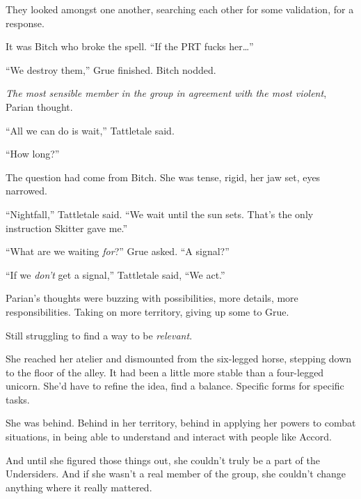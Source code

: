 They looked amongst one another, searching each other for some validation, for a response.



It was Bitch who broke the spell.  ``If the PRT fucks her\ldots''



``We destroy them,'' Grue finished.  Bitch nodded.



\emph{The most sensible member in the group in agreement with the most violent}, Parian thought.



``All we can do is wait,'' Tattletale said.



``How long?''



The question had come from Bitch.  She was tense, rigid, her jaw set, eyes narrowed.



``Nightfall,'' Tattletale said.  ``We wait until the sun sets.  That's the only instruction Skitter gave me.''



``What are we waiting \emph{for}?'' Grue asked.  ``A signal?''



``If we \emph{don't} get a signal,'' Tattletale said, ``We act.''



\blacksquare



Parian's thoughts were buzzing with possibilities, more details, more responsibilities.  Taking on more territory, giving up some to Grue.



Still struggling to find a way to be \emph{relevant}.



She reached her atelier and dismounted from the six-legged horse, stepping down to the floor of the alley.  It had been a little more stable than a four-legged unicorn.  She'd have to refine the idea, find a balance.  Specific forms for specific tasks.



She was behind.  Behind in her territory, behind in applying her powers to combat situations, in being able to understand and interact with people like Accord.



And until she figured those things out, she couldn't truly be a part of the Undersiders.  And if she wasn't a real member of the group, she couldn't change anything where it really mattered.



